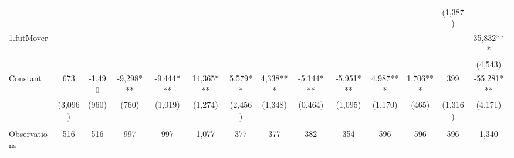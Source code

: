 \begin{tabular}{lccccccccccccc}
 &  &  &  &  &  &  &  &  &  &  &  & (1,387) &  \\
1.futMover &  &  &  &  &  &  &  &  &  &  &  &  & 35,832*** \\
 &  &  &  &  &  &  &  &  &  &  &  &  & (4,543) \\
Constant & 673 & -1,490 & -9,298*** & -9,444*** & 14,365*** & 5,579** & 4,338*** & -5.144*** & -5,951*** & 4,987*** & 1,706*** & 399 & -55,281*** \\
 & (3,096) & (960) & (760) & (1,019) & (1,274) & (2,456) & (1,348) & (0.464) & (1,095) & (1,170) & (465) & (1,316) & (4,171) \\
 &  &  &  &  &  &  &  &  &  &  &  &  &  \\
 Observations & 516 & 516 & 997 & 997 & 1,077 & 377 & 377 & 382 & 354 & 596 & 596 & 596 & 1,340 \\ \hline
\end{tabular}
